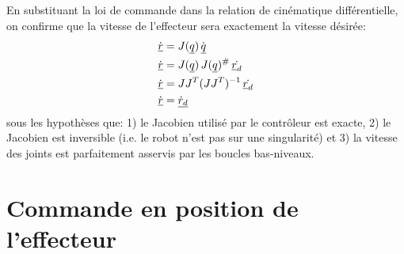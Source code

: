 En substituant la loi de commande dans la relation de cinématique différentielle, on confirme que la vitesse de l'effecteur sera exactement la vitesse désirée:
\begin{align}
\dot{\underline{r}} &= J(\underline{q}) \, \dot{\underline{q}} \\
\dot{\underline{r}} &= J(\underline{q}) \, J(\underline{q})^{\#} \, \dot{\underline{r}_d} \\
\dot{\underline{r}} &= J J^T (J J^T)^{-1} \, \dot{\underline{r}_d} \\
\dot{\underline{r}} &=  \underline{\dot{r}_d} 
\end{align}
sous les hypothèses que: 1) le Jacobien utilisé par le contrôleur est exacte, 2) le Jacobien est inversible (i.e. le robot n'est pas sur une singularité) et 3) la vitesse des joints est parfaitement asservis par les boucles bas-niveaux. 




\newpage
\section{Commande en position de l'effecteur}
\label{sec:positioncontrol}

